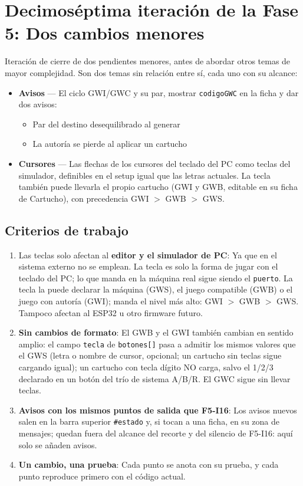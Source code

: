 \section{Decimoséptima iteración de la Fase 5: Dos cambios menores}
\label{sec:F5I17}

Iteración de cierre de dos pendientes menores, antes de abordar otros temas de mayor complejidad. Son dos temas sin relación entre sí, cada uno con su alcance:

\begin{itemize}
	\item \textbf{Avisos} — El ciclo GWI/GWC y su par, mostrar \texttt{codigoGWC} en la ficha y dar dos avisos:
	 \begin{itemize}
	 	\item Par del destino desequilibrado al generar
	 	\item La autoría se pierde al aplicar un cartucho
	 	\end{itemize}
	 	
	\item \textbf{Cursores} — Las flechas de los cursores del teclado del PC como teclas del simulador, definibles en el setup igual que las letras actuales. La tecla también puede llevarla el propio cartucho (GWI y GWB, editable en su ficha de Cartucho), con precedencia GWI $>$ GWB $>$ GWS.
\end{itemize}

\subsection{Criterios de trabajo}
\label{sec:F5I17Criterios}

\begin{enumerate}
	\item Las teclas solo afectan al \textbf{editor y el simulador de PC}: Ya que en el sistema externo no se emplean. La tecla es solo la forma de jugar con el teclado del PC; lo que manda en la máquina real sigue siendo el \texttt{puerto}. La tecla la puede declarar la máquina (GWS), el juego compatible (GWB) o el juego con autoría (GWI); manda el nivel más alto: GWI $>$ GWB $>$ GWS. Tampoco afectan al ESP32 u otro firmware futuro.
	
	\item \textbf{Sin cambios de formato}: El GWB y el GWI también cambian en sentido amplio: el campo \texttt{tecla} de \texttt{botones[]} pasa a admitir los mismos valores que el GWS (letra o nombre de cursor, opcional; un cartucho sin teclas sigue cargando igual); un cartucho con tecla dígito NO carga, salvo el 1/2/3 declarado en un botón del trío de sistema A/B/R. El GWC sigue sin llevar teclas.
	
	\item \textbf{Avisos con los mismos puntos de salida que F5-I16}: Los avisos nuevos salen en la barra superior \texttt{\#estado} y, si tocan a una ficha, en su zona de mensajes; quedan fuera del alcance del recorte y del silencio de F5-I16: aquí solo se añaden avisos.
	
	\item \textbf{Un cambio, una prueba}: Cada punto se anota con su prueba, y cada punto reproduce primero con el código actual.
\end{enumerate}

